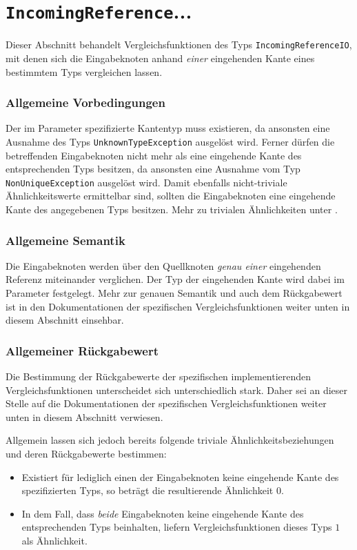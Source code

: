 %
%

\section{\texttt{IncomingReference}...}
\label{strct:spec:inref}
Dieser Abschnitt behandelt Vergleichsfunktionen des Typs \texttt{IncomingReferenceIO}, mit denen sich die Eingabeknoten anhand \emph{einer} eingehenden Kante eines bestimmtem Typs vergleichen lassen.

\subsubsection*{Allgemeine Vorbedingungen}
Der im Parameter spezifizierte Kantentyp muss existieren, da ansonsten eine Ausnahme des Typs \texttt{UnknownTypeException} ausgelöst wird. Ferner dürfen die betreffenden Eingabeknoten nicht mehr als eine eingehende Kante des entsprechenden Typs besitzen, da ansonsten eine Ausnahme vom Typ \texttt{NonUniqueException} ausgelöst wird. Damit ebenfalls nicht-triviale Ähnlichkeitswerte ermittelbar sind, sollten die Eingabeknoten eine eingehende Kante des angegebenen Typs besitzen. Mehr zu trivialen Ähnlichkeiten unter .

\subsubsection*{Allgemeine Semantik}
Die Eingabeknoten werden über den Quellknoten \emph{genau einer} eingehenden Referenz miteinander verglichen. Der Typ der eingehenden Kante wird dabei im Parameter festgelegt. Mehr zur genauen Semantik und auch dem Rückgabewert ist in den Dokumentationen der spezifischen Vergleichsfunktionen weiter unten in diesem Abschnitt einsehbar.

\subsubsection*{Allgemeiner Rückgabewert}
Die Bestimmung der Rückgabewerte der spezifischen implementierenden Vergleichsfunktionen unterscheidet sich unterschiedlich stark. Daher sei an dieser Stelle auf die Dokumentationen der spezifischen Vergleichsfunktionen weiter unten in diesem Abschnitt verwiesen.

Allgemein lassen sich jedoch bereits folgende triviale Ähnlichkeitsbeziehungen und deren Rückgabewerte bestimmen:
\begin{itemize}
	\item Existiert für lediglich einen der Eingabeknoten keine eingehende Kante des spezifizierten Typs, so beträgt die resultierende Ähnlichkeit $0$.
	\item In dem Fall, dass \emph{beide} Eingabeknoten keine eingehende Kante des entsprechenden Typs beinhalten, liefern Vergleichsfunktionen dieses Typs $1$ als Ähnlichkeit.
\end{itemize}

